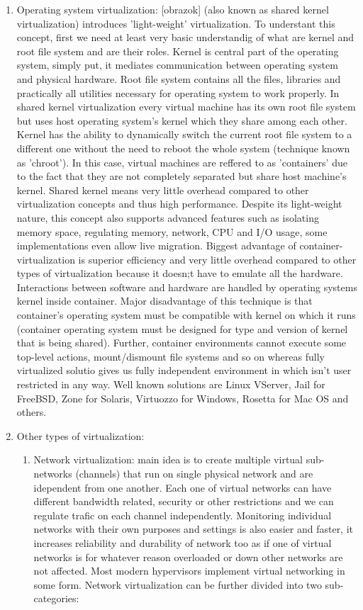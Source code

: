 \begin{enumerate}
\item Operating system virtualization: [obrazok] (also known as shared kernel virtualization) introduces 'light-weight' virtualization. To understant this concept, first we need at least very basic understandig of what are kernel and root file system and are their roles. Kernel is central part of the operating system, simply put, it mediates communication between operating system and physical hardware. Root file system contains all the files, libraries and practically all utilities necessary for operating system to work properly. In shared kernel virtualization every virtual machine has its own root file system but uses host operating system's kernel which they share among each other. Kernel has the ability to dynamically switch the current root file system to a different one without the need to reboot the whole system (technique known as 'chroot'). In this case, virtual machines are reffered to as 'containers' due to the fact that they are not completely separated but share host machine's kernel. Shared kernel means very little overhead compared to other virtualization concepts and thus high performance. Despite its light-weight nature, this concept also supports advanced features such as isolating memory space, regulating memory, network, CPU and I/O usage, some implementations even allow live migration. Biggest advantage of container-virtualization is superior efficiency and very little overhead compared to other types of virtualization because it doesn;t have to emulate all the hardware. Interactions between software and hardware are handled by operating systems kernel inside container. Major disadvantage of this technique is that container's operating system must be compatible with kernel on which it runs (container operating system must be designed for type and version of kernel that is being shared). Further, container environments cannot execute some top-level actions, mount/dismount file systems and so on whereas fully virtualized solutio gives us fully independent environment in which isn't user restricted in any way.
Well known solutions are Linux VServer, Jail for FreeBSD, Zone for Solaris, Virtuozzo for Windows, Rosetta for Mac OS and others.

\item Other types of virtualization:
\begin{enumerate}
\item Network virtualization: main idea is to create multiple virtual sub-networks (channels) that run on single physical network and are idependent from one another. Each one of virtual networks can have different bandwidth related, security or other restrictions and we can regulate trafic on each channel independently.  Monitoring individual networks with their own purposes and settings is also easier and faster, it increases reliability and durability of network too as if one of virtual networks is for whatever reason overloaded or down other networks are not affected. Most modern hypervisors implement virtual networking in some form. Network virtualization can be further divided into two sub-categories:
\begin{enumerate}


\end{enumerate}
\end{enumerate}
\end{enumerate}
